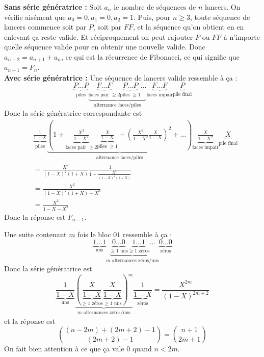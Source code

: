 \begin{sol}
\textbf{Sans série génératrice :} Soit $a_n$ le nombre de séquences de $n$ lancers. On vérifie aisément que $a_0 = 0, a_1 = 0, a_2 = 1$. Puis, pour $n \ge 3$, toute séquence de lancers commence soit par $P$, soit par $FF$, et la séquence qu'on obtient en en enlevant ça reste valide. Et réciproquement on peut rajouter $P$ ou $FF$ à n'importe quelle séquence valide pour en obtenir une nouvelle valide. Donc $a_{n + 2} = a_{n + 1} + a_n$, ce qui est la récurrence de Fibonacci, ce qui signifie que $a_{n + 1} = F_n$. \\
\textbf{Avec série génératrice :} Une séquence de lancers valide ressemble à ça :
$$\underbrace{P\dots P}_{\text{piles}}\underbrace{\underbrace{F\dots F}_{\text{faces pair $\ge 2$}}\underbrace{P\dots P}_{\text{piles $\ge 1$}}\dots}_{\text{alternance faces/piles}}\underbrace{F\dots F}_{\text{faces impair}}\underbrace{P}_{\text{pile final}}$$
Donc la série génératrice correspondante est
\begin{align*}
& \underbrace{\frac 1{1 - X}}_{\text{piles}}\underbrace{\left(1 + \underbrace{\frac{X^2}{1 - X^2}}_{\text{faces pair $\ge 2$}}\underbrace{\frac X{1 - X}}_{\text{piles $\ge 1$}} + \left(\frac{X^2}{1 - X^2}\frac X{1 - X}\right)^2 + \dots\right)}_{\text{alternance faces/piles}}\underbrace{\frac X{1 - X^2}}_{\text{faces impair}}\underbrace{X}_{\text{pile final}} \\
& = \frac{X^2}{(1 - X)^2(1 + X)}\frac 1{1 - \frac{X^3}{(1 - X)^2(1 + X)}} \\
& = \frac{X^2}{(1 - X)^2(1 + X) - X^3} \\
& = \frac{X^2}{1 - X - X^2}
\end{align*}
Donc la réponse est $F_{n - 1}$.
\end{sol}


\begin{sol}
\end{sol}


\begin{sol}
Une suite contenant $m$ fois le bloc $01$ ressemble à ça :
$$\underbrace{1\dots 1}_{\text{uns}}\underbrace{\underbrace{0\dots 0}_{\ge 1 \text{ uns}}\underbrace{1\dots 1}_{\ge 1 \text{ zéros}}\dots}_{\text{$m$ alternances zéros/uns}}\underbrace{0\dots 0}_{\text{zéros}}$$
Donc la série génératrice est
$$\underbrace{\frac 1{1 - X}}_{\text{uns}}\underbrace{\left(\underbrace{\frac X{1 - X}}_{\ge 1 \text{ zéros}}\underbrace{\frac X{1 - X}}_{\ge 1 \text{ uns}}\right)^m}_{\text{$m$ alternances zéros/uns}}\underbrace{\frac 1{1 - X}}_{\text{zéros}} = \frac{X^{2m}}{(1 - X)^{2m + 2}}$$
et la réponse est
$$\binom{(n - 2m) + (2m + 2) - 1}{(2m + 2) - 1} = \binom{n + 1}{2m + 1}$$
On fait bien attention à ce que ça vale $0$ quand $n < 2m$.
\end{sol}


